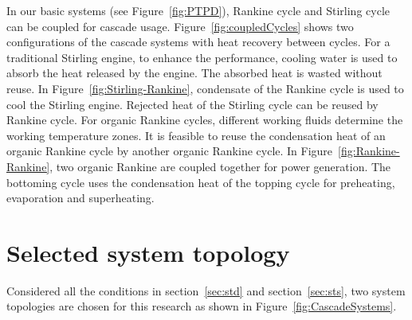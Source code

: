 In our basic systems (see Figure~\ref{fig:PTPD}), Rankine cycle and Stirling cycle can be coupled for cascade usage. 
Figure~\ref{fig:coupledCycles} shows two configurations of the cascade systems with heat recovery between cycles. 
For a traditional Stirling engine, to enhance the performance, cooling water is used to absorb the heat released by the engine. The absorbed heat is wasted without reuse.
In Figure~\ref{fig:Stirling-Rankine}, condensate of the Rankine cycle is used to cool the Stirling engine. Rejected heat of the Stirling cycle can be reused by Rankine cycle. 
For organic Rankine cycles, different working fluids determine the working temperature zones. It is feasible to reuse the condensation heat of an organic Rankine cycle by another organic Rankine cycle.
In Figure~\ref{fig:Rankine-Rankine}, two organic Rankine are coupled together for power generation. The bottoming cycle uses the condensation heat of the topping cycle for preheating, evaporation and superheating.

\section{Selected system topology}
\label{sec:sst}
Considered all the conditions in section~\ref{sec:std} and section~\ref{sec:sts}, two system topologies are chosen for this research as shown in Figure~\ref{fig:CascadeSystems}. 


